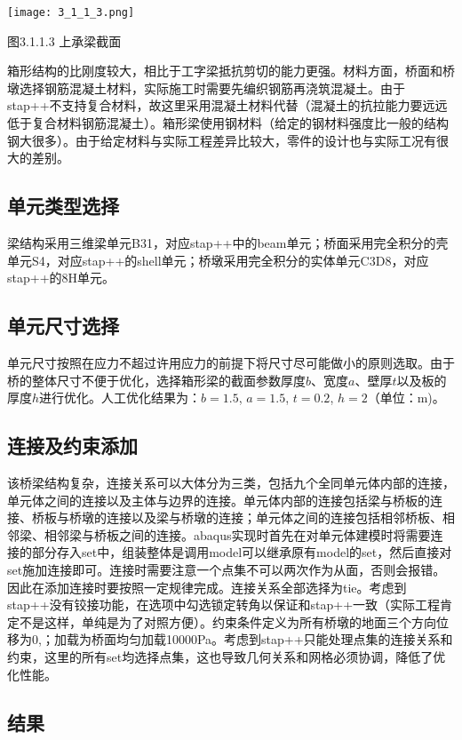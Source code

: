 \documentclass[forprint]{WHUBachelor}
\begin{document}
\texttt{[image: 3\_1\_1\_3.png]}

图3.1.1.3 上承梁截面

箱形结构的比刚度较大，相比于工字梁抵抗剪切的能力更强。材料方面，桥面和桥墩选择钢筋混凝土材料，实际施工时需要先编织钢筋再浇筑混凝土。由于stap++不支持复合材料，故这里采用混凝土材料代替（混凝土的抗拉能力要远远低于复合材料钢筋混凝土）。箱形梁使用钢材料（给定的钢材料强度比一般的结构钢大很多）。由于给定材料与实际工程差异比较大，零件的设计也与实际工况有很大的差别。

\subsection{单元类型选择}

梁结构采用三维梁单元B31，对应stap++中的beam单元；桥面采用完全积分的壳单元S4，对应stap++的shell单元；桥墩采用完全积分的实体单元C3D8，对应stap++的8H单元。

\subsection{单元尺寸选择}

单元尺寸按照在应力不超过许用应力的前提下将尺寸尽可能做小的原则选取。由于桥的整体尺寸不便于优化，选择箱形梁的截面参数厚度$b$、宽度$a$、壁厚$t$以及板的厚度$h$进行优化。人工优化结果为：$b=1.5$,
$a=1.5$, $t=0.2$, $h=2$（单位：m)。

\subsection{连接及约束添加}

该桥梁结构复杂，连接关系可以大体分为三类，包括九个全同单元体内部的连接，单元体之间的连接以及主体与边界的连接。单元体内部的连接包括梁与桥板的连接、桥板与桥墩的连接以及梁与桥墩的连接；单元体之间的连接包括相邻桥板、相邻梁、相邻梁与桥板之间的连接。abaqus实现时首先在对单元体建模时将需要连接的部分存入set中，组装整体是调用model可以继承原有model的set，然后直接对set施加连接即可。连接时需要注意一个点集不可以两次作为从面，否则会报错。因此在添加连接时要按照一定规律完成。连接关系全部选择为tie。考虑到stap++没有铰接功能，在选项中勾选锁定转角以保证和stap++一致（实际工程肯定不是这样，单纯是为了对照方便）。约束条件定义为所有桥墩的地面三个方向位移为0,；加载为桥面均匀加载10000Pa。考虑到stap++只能处理点集的连接关系和约束，这里的所有set均选择点集，这也导致几何关系和网格必须协调，降低了优化性能。

\subsection{结果}
\end{document}
